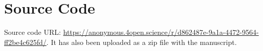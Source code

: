 \section{Source Code}
Source code URL: \url{https://anonymous.4open.science/r/d862487e-9a1a-4472-9564-ff2be4c625fd/}. It has also been uploaded as a zip file with the manuscript.
